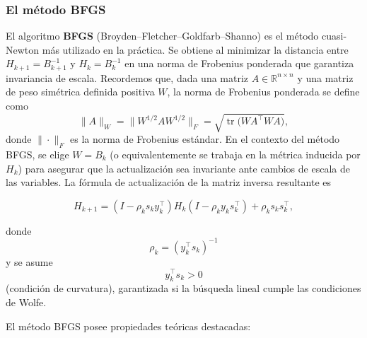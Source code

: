 \documentclass[
  spanish,
  us-letterpaper,
]{scrreprt}
\numberwithin{equation}{section}
\begin{document}
\subsubsection{El método BFGS}\label{el-muxe9todo-bfgs}

El algoritmo \textbf{BFGS} (Broyden--Fletcher--Goldfarb--Shanno) es el
método cuasi-Newton más utilizado en la práctica. Se obtiene al
minimizar la distancia entre \(H_{k+1} = B_{k+1}^{-1}\) y
\(H_k = B_k^{-1}\) en una norma de Frobenius ponderada que garantiza
invariancia de escala. Recordemos que, dada una matriz
\(A \in \mathbb{R}^{n \times n}\) y una matriz de peso simétrica
definida positiva \(W\), la norma de Frobenius ponderada se define como
\[
\|A\|_W = \|W^{1/2} A W^{1/2}\|_F = \sqrt{\operatorname{tr}\!\big(W A^\top W A\big)},
\] donde \(\|\cdot\|_F\) es la norma de Frobenius estándar. En el
contexto del método BFGS, se elige \(W = B_k\) (o equivalentemente se
trabaja en la métrica inducida por \(H_k\)) para asegurar que la
actualización sea invariante ante cambios de escala de las variables. La
fórmula de actualización de la matriz inversa resultante es

\[
H_{k+1} = (I - \rho_k s_k y_k^\top) H_k (I - \rho_k y_k s_k^\top) + \rho_k s_k s_k^\top,
\]

donde \[\rho_k = (y_k^\top s_k)^{-1}\] y se asume \[y_k^\top s_k > 0\]
(condición de curvatura), garantizada si la búsqueda lineal cumple las
condiciones de Wolfe.

El método BFGS posee propiedades teóricas destacadas:
\end{document}
